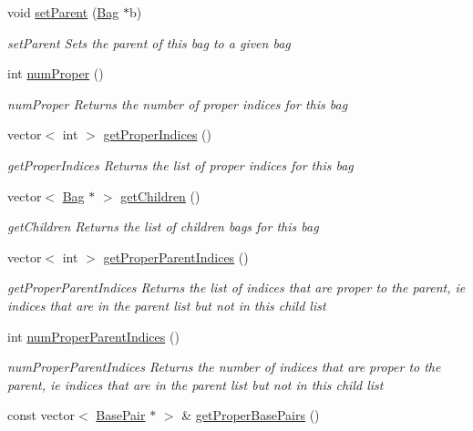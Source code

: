 \begin{DoxyCompactItemize}
void \hyperlink{class_bag_a44101c6b26782dbe076d51e77f35ce81}{set\+Parent} (\hyperlink{class_bag}{Bag} $\ast$b)
\begin{DoxyCompactList}\small\item\em set\+Parent Sets the parent of this bag to a given bag \end{DoxyCompactList}\item 
int \hyperlink{class_bag_a03b31223756e1f3d7c040a72e53597d7}{num\+Proper} ()
\begin{DoxyCompactList}\small\item\em num\+Proper Returns the number of proper indices for this bag \end{DoxyCompactList}\item 
vector$<$ int $>$ \hyperlink{class_bag_a84860e8af1eed9547b7c20d77d29da7d}{get\+Proper\+Indices} ()
\begin{DoxyCompactList}\small\item\em get\+Proper\+Indices Returns the list of proper indices for this bag \end{DoxyCompactList}\item 
vector$<$ \hyperlink{class_bag}{Bag} $\ast$ $>$ \hyperlink{class_bag_a79094c130b1fd55e49afeeafa70c454b}{get\+Children} ()
\begin{DoxyCompactList}\small\item\em get\+Children Returns the list of children bags for this bag \end{DoxyCompactList}\item 
vector$<$ int $>$ \hyperlink{class_bag_a1a7660f8e31d6941fdec07c86e0fe3ac}{get\+Proper\+Parent\+Indices} ()
\begin{DoxyCompactList}\small\item\em get\+Proper\+Parent\+Indices Returns the list of indices that are proper to the parent, ie indices that are in the parent list but not in this child list \end{DoxyCompactList}\item 
int \hyperlink{class_bag_adb324085144f4ea2d1e5d0cfc008c591}{num\+Proper\+Parent\+Indices} ()
\begin{DoxyCompactList}\small\item\em num\+Proper\+Parent\+Indices Returns the number of indices that are proper to the parent, ie indices that are in the parent list but not in this child list \end{DoxyCompactList}\item 
const vector$<$ \hyperlink{class_base_pair}{Base\+Pair} $\ast$ $>$ \& \hyperlink{class_bag_aab67f05a274db8a02738f88c250f4cb1}{get\+Proper\+Base\+Pairs} ()

\end{DoxyCompactItemize}
